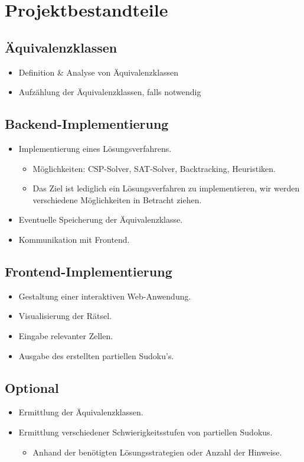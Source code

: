\documentclass[11pt,a4paper]{article}
\begin{document}
\section{Projektbestandteile}

\subsection{Äquivalenzklassen}
\begin{itemize}
    \item Definition \& Analyse von Äquivalenzklassen
    \item Aufzählung der Äquivalenzklassen, falls notwendig
\end{itemize}

\subsection{Backend-Implementierung}
\begin{itemize}
    \item Implementierung eines Lösungsverfahrens.
    \begin{itemize}
        \item Möglichkeiten: CSP-Solver, SAT-Solver, Backtracking, Heuristiken.
        \item Das Ziel ist lediglich ein Lösungsverfahren zu implementieren, wir werden verschiedene Möglichkeiten in Betracht ziehen.
    \end{itemize}
    \item Eventuelle Speicherung der Äquivalenzklasse.
    \item Kommunikation mit Frontend.
\end{itemize}

\subsection{Frontend-Implementierung}
\begin{itemize}
    \item Gestaltung einer interaktiven Web-Anwendung.
    \item Visualisierung der Rätsel.
    \item Eingabe relevanter Zellen.
    \item Ausgabe des erstellten partiellen Sudoku's.
\end{itemize}

\subsection{Optional}
\begin{itemize}
    \item Ermittlung der Äquivalenzklassen.
    \item Ermittlung verschiedener Schwierigkeitsstufen von partiellen Sudokus.
    \begin{itemize}
        \item Anhand der benötigten Lösungsstrategien oder Anzahl der Hinweise.
    \end{itemize}
\end{itemize}
\end{document}

